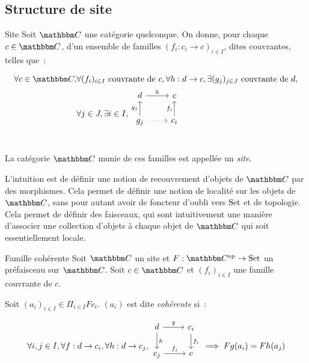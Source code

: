 \subsection{Structure de site}

\begin{defi}{Site}
    Soit $\C$ une catégorie quelconque. On donne, pour
    chaque $c\in\C$, d'un ensemble de familles $(f_i : c_i\rightarrow c)_{i\in I}$,
    dites couvrantes, telles que~:

    \begin{align*}
        \forall c\in\C, & \forall (f_i)_{i\in I} \text{ couvrante de } c,
          \forall h : d\rightarrow c, \exists (g_j)_{j\in J} \text{ couvrante de } d, \\
        & \forall j\in J, \exists i\in I,
          \begin{tikzcd}[ampersand replacement=\&]
            d \arrow[r, "h"] \& c \\
            g_j \arrow[u, "g_j"] \arrow[r, dotted] \& c_i \arrow[u, "f_i"] \\
          \end{tikzcd}
    \end{align*}

    La catégorie $\C$ munie de ces familles est appellée un \emph{site}.
\end{defi}

L'intuition est de définir une notion de recouvrement d'objets de $\C$ par des morphismes.
Cela permet de définir une notion de localité sur les objets de $\C$, sans pour autant
avoir de foncteur d'oubli vers $\text{Set}$ et de topologie. Cela permet de définir des
faisceaux, qui sont intuitivement une manière d'associer une collection d'objets à
chaque objet de $\C$ qui soit essentiellement locale.

\begin{defi}{Famille cohérente}
    Soit $\C$ un site et $F : \C^{\text{op}}\rightarrow\Set$ un préfaisceau sur
    $\C$. Soit $c\in\C$ et $(f_i)_{i\in I}$ une famille couvrante de $c$.
    
    Soit $(a_i)_{i\in I}\in \Pi_{i\in I} Fc_i$. $(a_i)$ est dite \emph{cohérente} si~:

    \[\forall i,j\in I, \forall f : d\rightarrow c_i, \forall h : d\rightarrow c_j,
      \begin{tikzcd}
          d \arrow[r, "g"] \arrow[d, "h"] & c_i \arrow[d, "f_i"] \\
          c_j \arrow[r, "f_j"] & c \\
      \end{tikzcd}
      \implies Fg(a_i) = Fh(a_j) \]
\end{defi}

